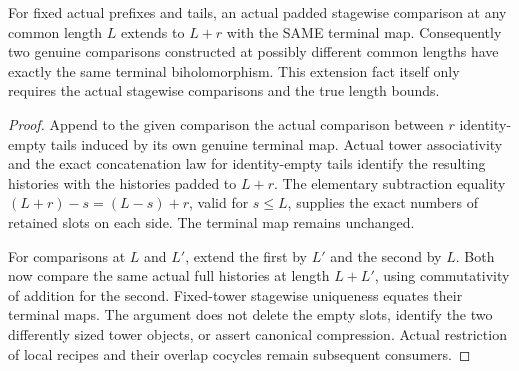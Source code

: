 \begin{theorem}
\label{hir:sharp-actual-terminal-recipe-padding-independence}
\leanok
For fixed actual prefixes and tails, an actual padded stagewise
comparison at any common length $L$ extends to $L+r$ with the SAME
terminal map. Consequently two genuine comparisons constructed at
possibly different common lengths have exactly the same terminal
biholomorphism. This extension fact itself only requires the actual
stagewise comparisons and the true length bounds.
\end{theorem}
\begin{proof}
Append to the given comparison the actual comparison between $r$
identity-empty tails induced by its own genuine terminal map. Actual
tower associativity and the exact concatenation law for identity-empty
tails identify the resulting histories with the histories padded to
$L+r$. The elementary subtraction equality
$(L+r)-s=(L-s)+r$, valid for $s\le L$, supplies the exact numbers of
retained slots on each side. The terminal map remains unchanged.

For comparisons at $L$ and $L'$, extend the first by $L'$ and the second
by $L$. Both now compare the same actual full histories at length
$L+L'$, using commutativity of addition for the second. Fixed-tower
stagewise uniqueness equates their terminal maps. The argument does
not delete the empty slots, identify the two differently sized tower
objects, or assert canonical compression. Actual restriction of local
recipes and their overlap cocycles remain subsequent consumers.
\end{proof}
